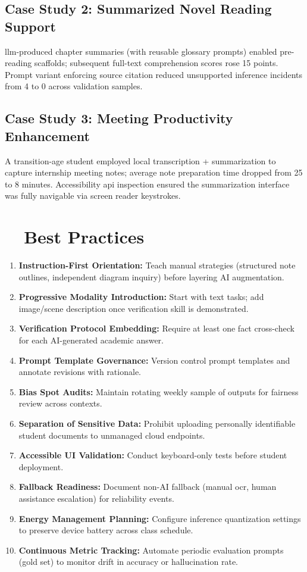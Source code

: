 \subsection{Case Study 2: Summarized Novel Reading Support}
\gls{llm}-produced chapter summaries (with reusable glossary prompts) enabled pre-reading scaffolds; subsequent full-text comprehension scores rose 15 points. Prompt variant enforcing source citation reduced unsupported inference incidents from 4 to 0 across validation samples.

\subsection{Case Study 3: Meeting Productivity Enhancement}
A transition-age student employed local transcription + summarization to capture internship meeting notes; average note preparation time dropped from 25 to 8 minutes. Accessibility \gls{api} inspection ensured the summarization interface was fully navigable via screen reader keystrokes.

\section{~~Best Practices}\label{ch9:sec:best-practices}
\begin{enumerate}
	\item \textbf{Instruction-First Orientation:} Teach manual strategies (structured note outlines, independent diagram inquiry) before layering AI augmentation.
	\item \textbf{Progressive Modality Introduction:} Start with text tasks; add image/scene description once verification skill is demonstrated.
	\item \textbf{Verification Protocol Embedding:} Require at least one fact cross-check for each AI-generated academic answer.
	\item \textbf{Prompt Template Governance:} Version control prompt templates and annotate revisions with rationale.
	\item \textbf{Bias Spot Audits:} Maintain rotating weekly sample of outputs for fairness review across contexts.\supercite{Bias_in_AI}
	\item \textbf{Separation of Sensitive Data:} Prohibit uploading personally identifiable student documents to unmanaged cloud endpoints.\supercite{DataPrivacyAI}
	\item \textbf{Accessible UI Validation:} Conduct keyboard-only  tests before student deployment.
	\item \textbf{Fallback Readiness:} Document non-AI fallback (manual \gls{ocr}, human assistance escalation) for reliability events.
	\item \textbf{Energy Management Planning:} Configure inference quantization settings to preserve device battery across class schedule.
	\item \textbf{Continuous Metric Tracking:} Automate periodic evaluation prompts (gold set) to monitor drift in accuracy or hallucination rate.
\end{enumerate}

